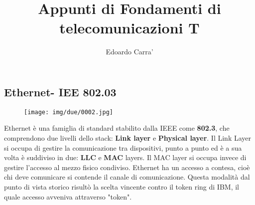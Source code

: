 \documentclass{article}
\title{Appunti di Fondamenti di telecomunicazioni T}
\author{Edoardo Carra'}
\begin{document}
\maketitle

\begin{comment}
    \caption{Virtualmente i livelli comunicano solo con livelli a loro pari,
    non c'è comunicazione tra livelli se non attraverso delle 
    apposite interfacce.
    Ogni livello è formato da software chiamato \textbf{protocollo}. }
    \texttt{[image: img/uno/0009.jpg]}
\end{SCfigure}

\begin{SCfigure}[0.7][!ht]
    \caption{L'applicazione utilizzerà delle primitive, offerte dallo stack
    di comunicazione.}
    \texttt{[image: img/uno/0014.jpg]}
\end{SCfigure}


\begin{SCfigure}[0.7][!ht]
    \centering
    \texttt{[image: img/uno/0016.jpg]}
\end{SCfigure}

\begin{SCfigure}[0.7][!ht]
    \caption{I nodi intermedi, come si può vedere dallo schema, si limitano 
    a gestire i primi tre livelli. Gli ultimi 4 livelli non sono 
    presenti nei nodi intermedi.}
    \texttt{[image: img/uno/0018.jpg]}
\end{SCfigure}

\begin{SCfigure}[0.7][!ht]
    \centering
    \texttt{[image: img/uno/0038.jpg]}
\end{SCfigure}
\end
\end{comment}

\subsection{Ethernet- IEE 802.03}
\begin{figure}[!ht]
    \centering
    \texttt{[image: img/due/0002.jpg]} 
\end{figure}

\noindent Ethernet è una famiglia di standard stabilito dalla IEEE come \textbf{802.3}, che comprendono due livelli dello stack:
 \textbf{Link layer} e \textbf{Physical layer}. 
Il Link Layer si occupa di gestire la comunicazione tra dispositivi, punto a punto ed è a sua volta è suddiviso in due: \textbf{LLC} e
 \textbf{MAC} layers. Il MAC layer si occupa invece di gestire l'accesso al mezzo fisico condiviso.
 Ethernet ha un accesso a contesa, cioè chi deve comunicare si contende il canale di comunicazione. Questa
 modalità dal punto di vista storico risultò la scelta vincente contro il token ring di IBM, il quale accesso avveniva
attraverso "token".
\end{document}
